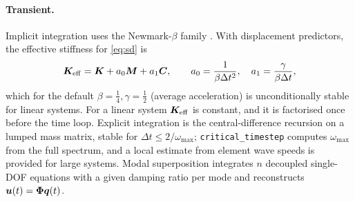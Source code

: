 \paragraph{Transient.}
Implicit integration uses the Newmark-$\beta$ family \cite{newmark1959}. With displacement predictors, the effective stiffness for \eqref{eq:sd} is
\begin{equation}
  \bm{K}_{\mathrm{eff}}=\bm{K}+a_0\bm{M}+a_1\bm{C},\qquad a_0=\frac{1}{\beta\Delta t^2},\quad a_1=\frac{\gamma}{\beta\Delta t},
  \label{eq:keff}
\end{equation}
which for the default $\beta=\tfrac14,\gamma=\tfrac12$ (average acceleration) is unconditionally stable for linear systems. For a linear system $\bm{K}_{\mathrm{eff}}$ is constant, and
it is factorised once before the time loop. Explicit integration is the central-difference recursion on a lumped mass matrix, stable for $\Delta t\le2/\omega_{\max}$; \texttt{critical\_timestep}
computes $\omega_{\max}$ from the full spectrum, and a local estimate from element wave speeds is provided for large systems. Modal superposition integrates $n$ decoupled single-DOF equations with a given damping ratio per mode and
reconstructs $\bm{u}(t)=\bm\Phi\bm q(t)$.
